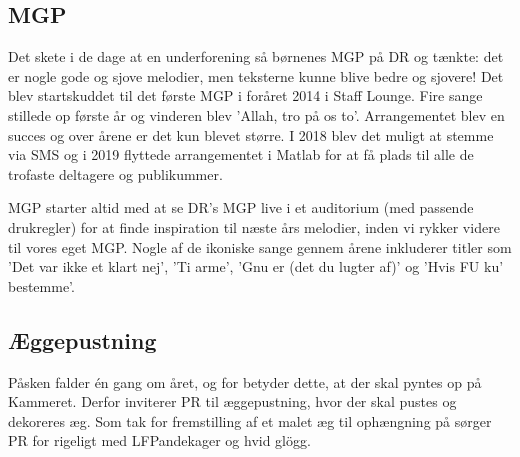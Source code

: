 \subsection{MGP}
Det skete i de dage at en underforening så børnenes MGP på DR og tænkte: det er nogle gode og sjove melodier, men teksterne kunne blive bedre og sjovere! Det blev startskuddet til det første MGP i foråret 2014 i Staff Lounge. Fire sange stillede op første år og vinderen blev 'Allah, tro på os to'. Arrangementet blev en succes og over årene er det kun blevet større. I 2018 blev det muligt at stemme via SMS og i 2019 flyttede arrangementet i Matlab for at få plads til alle de trofaste deltagere og publikummer.

MGP starter altid med at se DR's MGP live i et auditorium (med passende drukregler) for at finde inspiration til næste års melodier, inden vi rykker videre til vores eget MGP. Nogle af de ikoniske sange gennem årene inkluderer titler som 'Det var ikke et klart nej', 'Ti arme', 'Gnu er (det du lugter af)' og 'Hvis FU ku' bestemme'. 


\subsection{Æggepustning}
Påsken falder én gang om året, og for \TKET betyder dette, at der skal pyntes op på Kammeret. Derfor inviterer PR til æggepustning, hvor der skal pustes og dekoreres æg. Som tak for fremstilling af et malet æg til ophængning på \TKET sørger PR for rigeligt med LFPandekager og hvid glögg.


